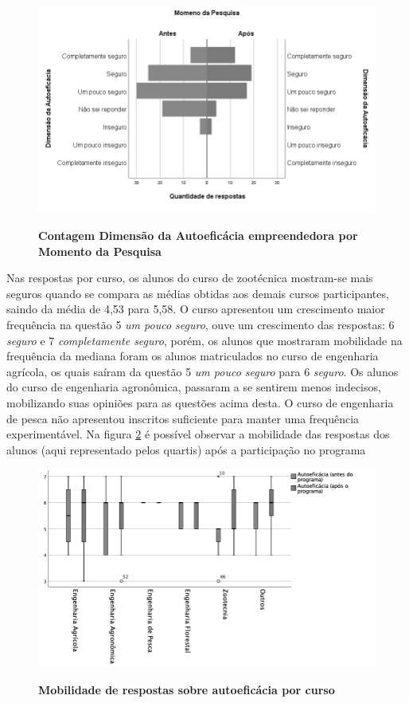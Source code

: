 \begin{figure}[H]
\centering
\caption{\textbf{
Contagem Dimensão da Autoeficácia empreendedora  por Momento da Pesquisa}}
\includegraphics[scale=0.6]{Imagens/histograma_autoeficacia_antes.png}
\label{figura_29}
\end{figure}


Nas respostas por curso, os alunos do curso de zootécnica mostram-se mais seguros quando se compara as médias obtidas aos demais cursos participantes, saindo da média de 4,53 para 5,58. O curso apresentou um crescimento maior frequência na questão 5 \textit{um pouco seguro}, ouve um crescimento das respostas: 6 \textit{seguro} e 7 \textit{completamente seguro}, porém, os alunos que mostraram mobilidade na frequência da mediana foram os alunos matriculados no curso de engenharia agrícola, os quais saíram da questão 5 \textit{um pouco seguro} para 6 \textit{seguro}. Os alunos do curso de engenharia agronômica, passaram a se sentirem menos indecisos, mobilizando suas opiniões para as questões acima desta. O curso de engenharia de pesca não apresentou inscritos suficiente para manter uma frequência experimentável. Na figura \ref{figura_34} é possível observar a mobilidade das respostas dos alunos (aqui representado pelos quartis) após a participação no programa


\begin{figure}[H]
\centering
\caption{\textbf{Mobilidade de respostas sobre autoeficácia por curso}}
\includegraphics[scale=0.6]{Imagens/boxplot_autoeficacia.png}
\label{figura_34}
\end{figure}


